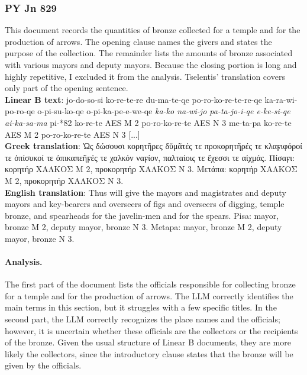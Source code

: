 \subsubsection{PY Jn 829}
This document records the quantities of bronze collected for a temple and for the production of arrows.
The opening clause names the givers and states the purpose of the collection.
The remainder lists the amounts of bronze associated with various mayors and deputy mayors.
Because the closing portion is long and highly repetitive, I excluded it from the analysis.
Tselentis' translation covers only part of the opening sentence. \\
\textbf{Linear B text}: jo-do-so-si ko-re-te-re du-ma-te-qe po-ro-ko-re-te-re-qe ka-ra-wi-po-ro-qe o-pi-su-ko-qe o-pi-ka-pe-e-we-qe \textit{ka-ko na-wi-jo pa-ta-jo-i-qe e-ke-si-qe ai-ka-sa-ma} pi-*82 ko-re-te AES M 2 po-ro-ko-re-te AES N 3 me-ta-pa ko-re-te AES M 2 po-ro-ko-re-te AES N 3 [...] \\
\textbf{Greek translation}: \textgreek{Ὡς δώσουσι κορητῆρες δῠμᾶτές τε προκορητῆρές τε κλαϝιφόροί τε ὀπίσυκοί τε ὀπικαπεῆϝές τε χαλκόν ναϝίον, παλταίοις τε ἔχεσσι τε αἰχμάς. Πίσαϝι: κορητήρ ΧΑΛΚΟΣ M 2, προκορητήρ ΧΑΛΚΟΣ N 3. Μετάπα: κορητήρ ΧΑΛΚΟΣ M 2, προκορητήρ ΧΑΛΚΟΣ N 3.} \\
\textbf{English translation}: Thus will give the mayors and magistrates and deputy mayors and key-bearers and overseers of figs and overseers of digging, temple bronze, and spearheads for the javelin-men and for the spears. Pisa: mayor, bronze M 2, deputy mayor, bronze N 3. Metapa: mayor, bronze M 2, deputy mayor, bronze N 3. 

\paragraph{Analysis.}
The first part of the document lists the officials responsible for collecting bronze for a temple and for the production of arrows.
The LLM correctly identifies the main terms in this section, but it struggles with a few specific titles.
In the second part, the LLM correctly recognizes the place names and the officials; however, it is uncertain whether these officials are the collectors or the recipients of the bronze.
Given the usual structure of Linear B documents, they are more likely the collectors, since the introductory clause states that the bronze will be given by the officials.


